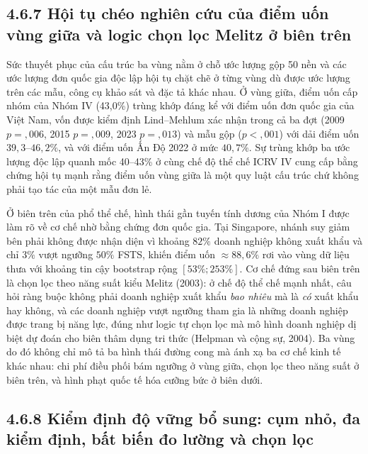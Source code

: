 \documentclass[
  a4paper,
  13pt]{extreport}
\begin{document}
\hypertarget{hux1ed9i-tux1ee5-chuxe9o-nghiuxean-cux1ee9u-cux1ee7a-ux111iux1ec3m-uux1ed1n-vuxf9ng-giux1eefa-vuxe0-logic-chux1ecdn-lux1ecdc-melitz-ux1edf-biuxean-truxean}{%
\subsection{4.6.7 Hội tụ chéo nghiên cứu của điểm uốn vùng giữa và logic
chọn lọc Melitz ở biên
trên}\label{hux1ed9i-tux1ee5-chuxe9o-nghiuxean-cux1ee9u-cux1ee7a-ux111iux1ec3m-uux1ed1n-vuxf9ng-giux1eefa-vuxe0-logic-chux1ecdn-lux1ecdc-melitz-ux1edf-biuxean-truxean}}

Sức thuyết phục của cấu trúc ba vùng nằm ở chỗ ước lượng gộp 50 nền và
các ước lượng đơn quốc gia độc lập hội tụ chặt chẽ ở từng vùng dù được
ước lượng trên các mẫu, công cụ khảo sát và đặc tả khác nhau. Ở vùng
giữa, điểm uốn cấp nhóm của Nhóm IV (43,0\%) trùng khớp đáng kể với điểm
uốn đơn quốc gia của Việt Nam, vốn được kiểm định Lind--Mehlum xác nhận
trong cả ba đợt (2009 \(p = {,}006\), 2015 \(p = {,}009\), 2023
\(p = {,}013\)) và mẫu gộp (\(p < {,}001\)) với dải điểm uốn
\(39{,}3\)--\(46{,}2\%\), và với điểm uốn Ấn Độ 2022 ở mức \(40{,}7\%\).
Sự trùng khớp ba ước lượng độc lập quanh mốc 40--43\% ở cùng chế độ thể
chế ICRV IV cung cấp bằng chứng hội tụ mạnh rằng điểm uốn vùng giữa là
một quy luật cấu trúc chứ không phải tạo tác của một mẫu đơn lẻ.

Ở biên trên của phổ thể chế, hình thái gần tuyến tính dương của Nhóm I
được làm rõ về cơ chế nhờ bằng chứng đơn quốc gia. Tại Singapore, nhánh
suy giảm bên phải không được nhận diện vì khoảng \(82\%\) doanh nghiệp
không xuất khẩu và chỉ \(3\%\) vượt ngưỡng \(50\%\) FSTS, khiến điểm uốn
\(\approx 88{,}6\%\) rơi vào vùng dữ liệu thưa với khoảng tin cậy
bootstrap rộng \([53\%; 253\%]\). Cơ chế đứng sau biên trên là chọn lọc
theo năng suất kiểu Melitz (2003): ở chế độ thể chế mạnh nhất, câu hỏi
ràng buộc không phải doanh nghiệp xuất khẩu \emph{bao nhiêu} mà là
\emph{có} xuất khẩu hay không, và các doanh nghiệp vượt ngưỡng tham gia
là những doanh nghiệp được trang bị năng lực, đúng như logic tự chọn lọc
mà mô hình doanh nghiệp dị biệt dự đoán cho biên thâm dụng tri thức
(Helpman và cộng sự, 2004). Ba vùng do đó không chỉ mô tả ba hình thái
đường cong mà ánh xạ ba cơ chế kinh tế khác nhau: chi phí điều phối bám
ngưỡng ở vùng giữa, chọn lọc theo năng suất ở biên trên, và hình phạt
quốc tế hóa cưỡng bức ở biên dưới.

\hypertarget{kiux1ec3m-ux111ux1ecbnh-ux111ux1ed9-vux1eefng-bux1ed5-sung-cux1ee5m-nhux1ecf-ux111a-kiux1ec3m-ux111ux1ecbnh-bux1ea5t-biux1ebfn-ux111o-lux1b0ux1eddng-vuxe0-chux1ecdn-lux1ecdc}{%
\subsection{4.6.8 Kiểm định độ vững bổ sung: cụm nhỏ, đa kiểm định, bất
biến đo lường và chọn
lọc}\label{kiux1ec3m-ux111ux1ecbnh-ux111ux1ed9-vux1eefng-bux1ed5-sung-cux1ee5m-nhux1ecf-ux111a-kiux1ec3m-ux111ux1ecbnh-bux1ea5t-biux1ebfn-ux111o-lux1b0ux1eddng-vuxe0-chux1ecdn-lux1ecdc}}
\end{document}
